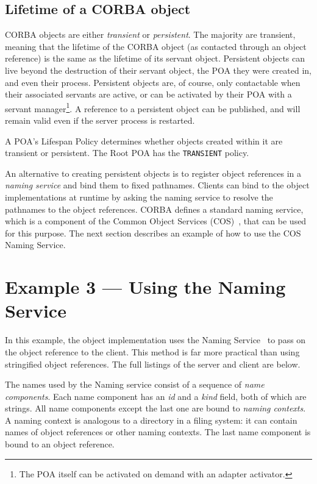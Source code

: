\documentclass[draft,11pt,twoside,a4paper]{book}
\newcommand{\code}[1]{\texttt{#1}}
\newcommand{\term}[1]{\textit{#1}}
\begin{document}
\subsection{Lifetime of a CORBA object}

CORBA objects are either \term{transient} or \term{persistent}. The
majority are transient, meaning that the lifetime of the CORBA object
(as contacted through an object reference) is the same as the lifetime
of its servant object. Persistent objects can live beyond the
destruction of their servant object, the POA they were created in, and
even their process. Persistent objects are, of course, only
contactable when their associated servants are active, or can be
activated by their POA with a servant manager\footnote{The POA itself
can be activated on demand with an adapter activator.}. A reference to
a persistent object can be published, and will remain valid even if
the server process is restarted.

A POA's Lifespan Policy determines whether objects created within it
are transient or persistent. The Root POA has the \code{TRANSIENT}
policy.

An alternative to creating persistent objects is to register object
references in a \term{naming service} and bind them to fixed
pathnames. Clients can bind to the object implementations at runtime
by asking the naming service to resolve the pathnames to the object
references. CORBA defines a standard naming service, which is a
component of the Common Object Services (COS)~\cite{corbaservices},
that can be used for this purpose. The next section describes an
example of how to use the COS Naming Service.



\section{Example 3 --- Using the Naming Service}
\label{sec:usingNS}

In this example, the object implementation uses the Naming
Service~\cite{corbaservices} to pass on the object reference to the
client.  This method is far more practical than using stringified
object references. The full listings of the server and client are
below.

The names used by the Naming service consist of a sequence of
\term{name components}. Each name component has an \term{id} and a
\term{kind} field, both of which are strings. All name components
except the last one are bound to \term{naming contexts}. A naming
context is analogous to a directory in a filing system: it can contain
names of object references or other naming contexts. The last name
component is bound to an object reference.
\end{document}
